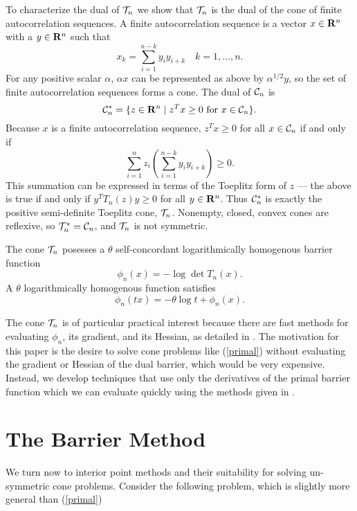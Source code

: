 \documentclass{article}
\begin{document}
To characterize the dual of $\mathcal{T}_n$ we show that $\mathcal{T}_n$ is the dual of the 
cone of finite autocorrelation sequences. A finite autocorrelation sequence is a vector
$x \in \mathbf{R}^n$ with a $y \in \mathbf{R}^n$ such that 
\[
  x_k = \sum_{i=1}^{n-k} y_iy_{i+k} \quad k=1,\ldots,n.
\] 
For any positive scalar $\alpha$, $\alpha x$ can be represented as above 
by $\alpha^{1/2}y$, so the set of finite autocorrelation sequences forms a cone.
The dual of $\mathcal{C}_n$ is 
\[
  \mathcal{C}^*_n = \{z \in \mathbf{R}^n \mid z^Tx \geq 0 \text{ for } x \in \mathcal{C}_n\}.
\]
Because $x$ is a finite autocorrelation sequence, $z^Tx \geq 0$ for all $x \in \mathcal{C}_n$
if and only if
\[
  \sum_{i=1}^n z_i \left(\sum_{i=1}^{n-k} y_iy_{i+k}\right) \geq 0.
\]
This summation can be expressed in terms of the Toeplitz form of $z$ ---
the above is true if and only if $y^TT_n(z)y \geq 0$ for all $y \in \mathbf{R}^n$. Thus
$\mathcal{C}^*_n$ is exactly the positive semi-definite Toeplitz cone, $\mathcal{T}_n$. Nonempty,
closed, convex cones are reflexive, so $\mathcal{T}_n^* = \mathcal{C}_n$, and $\mathcal{T}_n$ is not
symmetric.

The cone $\mathcal{T}_n$ posesses a $\theta$ self-concordant logarithmically homogenous barrier function
\[
\phi_n(x) = - \log \det T_n(x).
\]
A $\theta$ logarithmically homogenous function satisfies
\[
 \phi_n(tx) = -\theta \log t + \phi_n(x).
\]

The cone $\mathcal{T}_n$ is of particular practical interest because there are fast methods for evaluating
$\phi_n$, its gradient, and its Hessian, as detailed in \cite{alkire2002convex}. The motivation for this
paper is the desire to solve cone problems like (\ref{primal}) without evaluating the
gradient or Hessian of the dual barrier, which would be very expensive. Instead, we develop
techniques that use only the derivatives of the primal barrier function which we can evaluate
quickly using the methods given in \cite{alkire2002convex}.

\section{The Barrier Method}

We turn now to interior point methods and their suitability for
solving un-symmetric cone problems. Consider the following problem, which is slightly 
more general than (\ref{primal})
\end{document}
